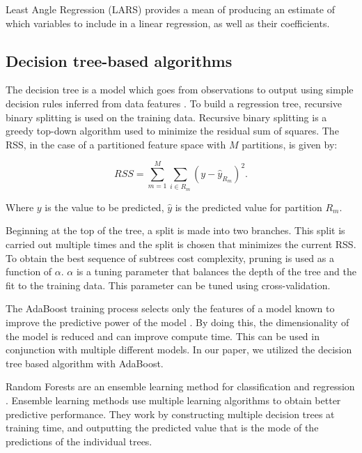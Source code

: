 Least Angle Regression (LARS) provides a mean of producing an estimate of which variables to include in a linear regression, as well as their coefficients.


%



\subsection{Decision tree-based algorithms}

The decision tree is a model which goes from observations to output using simple decision rules inferred from data features \cite{Quinlan}. To build a regression tree, recursive binary splitting is used on the training data. Recursive binary splitting is a greedy top-down algorithm used to minimize the residual sum of squares. The RSS, in the case of a partitioned feature space with $M$ partitions, is given by:

\begin{equation}
    RSS=\sum^M_{m=1}\sum_{i\in R_m}(y-\hat{y}_{R_m})^2.
\end{equation}

\noindent Where $y$ is the value to be predicted, $\hat{y}$ is the predicted value for partition $R_m$.



Beginning at the top of the tree, a split is made into two branches. This split is carried out multiple times and the split is chosen that minimizes the current RSS. To obtain the best sequence of subtrees cost complexity, pruning is used as a function of $\alpha$. $\alpha$ is a tuning parameter that balances the depth of the tree and the fit to the training data. This parameter can be tuned using cross-validation.


The AdaBoost training process selects only the features of a model known to improve the predictive power of the model \cite{Freund1997}. By doing this, the dimensionality of the model is reduced and can improve compute time. This can be used in conjunction with multiple different models. In our paper, we utilized the decision tree based algorithm with AdaBoost.


Random Forests are an ensemble learning method for classification and regression \cite{Breiman2001}. Ensemble learning methods use multiple learning algorithms to obtain better predictive performance. They work by constructing multiple decision trees at training time, and outputting the predicted value that is the mode of the predictions of the individual trees.

